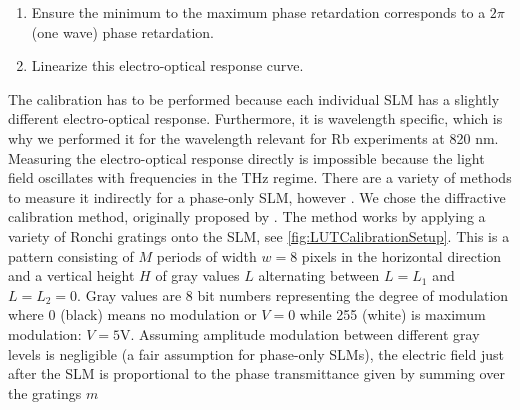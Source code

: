 \begin{enumerate}
    \itemsep=0pt
    
    \item Ensure the minimum to the maximum phase retardation corresponds to a $2\pi$ (one wave) phase retardation.
    
    \item Linearize this electro-optical response curve. 
\end{enumerate}
The calibration has to be performed because each individual SLM has a slightly different electro-optical response. 
Furthermore, it is wavelength specific, which is why we performed it for the wavelength relevant for Rb experiments at 820 nm. 
Measuring the electro-optical response directly is impossible because the light field oscillates with frequencies in the THz regime.
There are a variety of methods to measure it indirectly for a phase-only \ac{SLM}, however \cite{Li2019}.
We chose the diffractive calibration method, originally proposed by \cite{Zhang1994}.
The method works by applying a variety of Ronchi gratings onto the SLM, see \cref{fig:LUTCalibrationSetup}.
This is a pattern consisting of $M$ periods of width $w=8$ pixels in the horizontal direction and a vertical height $H$ of gray values $L$ alternating between $L=L_1$ and $L=L_2=0$.
Gray values are 8 bit numbers representing the degree of modulation where 0 (black) means no modulation or $V=0$ while 255 (white) is maximum modulation: $V=5$V.
Assuming amplitude modulation between different gray levels is negligible (a fair assumption for phase-only SLMs), the electric field just after the SLM is proportional to the phase transmittance given by summing over the gratings $m$ \cite{Zhang1994}


